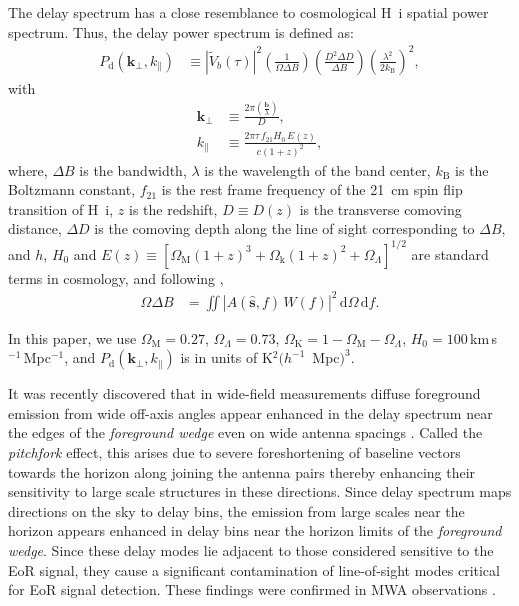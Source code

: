 \documentclass[preprint2,iop,numberedappendix,twocolappendix,appendixfloats]{emulateapj}
\newcommand{\dif}{\mathrm{d}}
\begin{document}
The delay spectrum has a close resemblance to cosmological H~{\sc i} spatial power spectrum. Thus, the delay power spectrum is defined as:
\begin{align}\label{eqn:delay-power-spectrum}
  P_\textrm{d}(\boldsymbol{k}_\perp,k_\parallel) &\equiv |\tilde{V}_b(\tau)|^2\left(\frac{1}{\Omega\Delta B}\right)\left(\frac{D^2\Delta D}{\Delta B}\right)\left(\frac{\lambda^2}{2k_\textrm{B}}\right)^2,
\end{align}
with
\begin{align}
  \boldsymbol{k}_\perp &\equiv \frac{2\pi(\frac{\boldsymbol{b}}{\lambda})}{D}, \label{eqn:kperp-baseline}\\
  k_\parallel &\equiv \frac{2\pi\tau\,f_{21}H_0\,E(z)}{c(1+z)^2}, \label{eqn:kprll-delay}
\end{align}
where, $\Delta B$ is the bandwidth, $\lambda$ is the wavelength of the band center, $k_\textrm{B}$ is the Boltzmann constant, $f_{21}$ is the rest frame frequency of the 21~cm spin flip transition of H~{\sc i}, $z$ is the redshift, $D\equiv D(z)$ is the transverse comoving distance, $\Delta D$ is the comoving depth along the line of sight corresponding to $\Delta B$, and $h$, $H_0$ and $E(z)\equiv [\Omega_\textrm{M}(1+z)^3+\Omega_\textrm{k}(1+z)^2+\Omega_\Lambda]^{1/2}$ are standard terms in cosmology, and following \citet{par14},
\begin{align}
  \Omega\Delta B &= \iint \left|A(\hat{\boldsymbol{s}},f)\,W(f)\right|^2\,\dif\Omega\,\dif f.
\end{align}

In this paper, we use $\Omega_\textrm{M}=0.27$, $\Omega_\Lambda=0.73$, $\Omega_\textrm{K}=1-\Omega_\textrm{M}-\Omega_\Lambda$, $H_0=100\,$km$\,$s$^{-1}\,$Mpc$^{-1}$, and $P_\textrm{d}(\boldsymbol{k}_\perp,k_\parallel)$ is in units of K$^2 (h^{-1}$~Mpc$)^3$.

It was recently discovered that in wide-field measurements diffuse foreground emission from wide off-axis angles appear enhanced in the delay spectrum near the edges of the {\it foreground wedge} even on wide antenna spacings \citep{thy15a}. Called the {\it pitchfork} effect, this arises due to severe foreshortening of baseline vectors towards the horizon along joining the antenna pairs thereby enhancing their sensitivity to large scale structures in these directions. Since delay spectrum maps directions on the sky to delay bins, the emission from large scales near the horizon appears enhanced in delay bins near the horizon limits of the {\it foreground wedge}. Since these delay modes lie adjacent to those considered sensitive to the EoR signal, they cause a significant contamination of line-of-sight modes critical for EoR signal detection. These findings were confirmed in MWA observations \citep{thy15b}.
\end{document}
